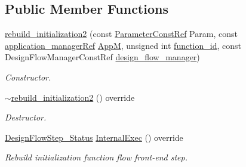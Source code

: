 \subsection*{Public Member Functions}
\begin{DoxyCompactItemize}
\item 
\hyperlink{classrebuild__initialization2_abe06363a4f1a11e01c21af0572a75916}{rebuild\+\_\+initialization2} (const \hyperlink{Parameter_8hpp_a37841774a6fcb479b597fdf8955eb4ea}{Parameter\+Const\+Ref} Param, const \hyperlink{application__manager_8hpp_a04ccad4e5ee401e8934306672082c180}{application\+\_\+manager\+Ref} \hyperlink{classFrontendFlowStep_a0ac0d8db2a378416583f51c4faa59d15}{AppM}, unsigned int \hyperlink{classFunctionFrontendFlowStep_a58ef2383ad1a212a8d3f396625a4b616}{function\+\_\+id}, const Design\+Flow\+Manager\+Const\+Ref \hyperlink{classDesignFlowStep_ab770677ddf087613add30024e16a5554}{design\+\_\+flow\+\_\+manager})
\begin{DoxyCompactList}\small\item\em Constructor. \end{DoxyCompactList}\item 
\hyperlink{classrebuild__initialization2_a33310f23ecaf85b79995c19975a21476}{$\sim$rebuild\+\_\+initialization2} () override
\begin{DoxyCompactList}\small\item\em Destructor. \end{DoxyCompactList}\item 
\hyperlink{design__flow__step_8hpp_afb1f0d73069c26076b8d31dbc8ebecdf}{Design\+Flow\+Step\+\_\+\+Status} \hyperlink{classrebuild__initialization2_ab0a55d5d212cac19ff646a5ca54deab6}{Internal\+Exec} () override
\begin{DoxyCompactList}\small\item\em Rebuild initialization function flow front-\/end step. \end{DoxyCompactList}\end{DoxyCompactItemize}
